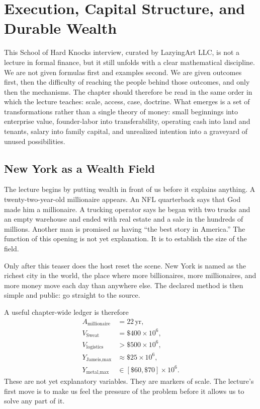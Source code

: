 \chapter{Execution, Capital Structure, and Durable Wealth}

This School of Hard Knocks interview, curated by LazyingArt LLC, is not a lecture in formal finance, but it still unfolds with a clear mathematical discipline. We are not given formulas first and examples second. We are given outcomes first, then the difficulty of reaching the people behind those outcomes, and only then the mechanisms. The chapter should therefore be read in the same order in which the lecture teaches: scale, access, case, doctrine. What emerges is a set of transformations rather than a single theory of money: small beginnings into enterprise value, founder-labor into transferability, operating cash into land and tenants, salary into family capital, and unrealized intention into a graveyard of unused possibilities.

\section{New York as a Wealth Field}

The lecture begins by putting wealth in front of us before it explains anything. A twenty-two-year-old millionaire appears. An NFL quarterback says that God made him a millionaire. A trucking operator says he began with two trucks and an empty warehouse and ended with real estate and a sale in the hundreds of millions. Another man is promised as having ``the best story in America.'' The function of this opening is not yet explanation. It is to establish the size of the field.

Only after this teaser does the host reset the scene. New York is named as the richest city in the world, the place where more billionaires, more millionaires, and more money move each day than anywhere else. The declared method is then simple and public: go straight to the source.

A useful chapter-wide ledger is therefore
\begin{align}
A_{\text{millionaire}}&=22\,\mathrm{yr},\\
V_{\text{Sweat}}&=\$400\times 10^6,\\
V_{\text{logistics}}&>\$500\times 10^6,\\
Y_{\text{Jameis,max}}&\approx \$25\times 10^6,\\
Y_{\text{metal,max}}&\in[\$60,\$70]\times 10^6.
\end{align}
These are not yet explanatory variables. They are markers of scale. The lecture's first move is to make us feel the pressure of the problem before it allows us to solve any part of it.

